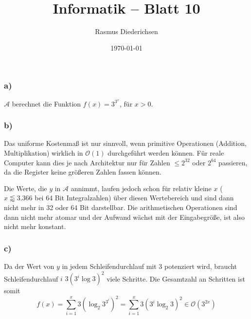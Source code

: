 \documentclass{article}
\title{Informatik \rotatebox[origin=c]{180}{D}\raisebox{2pt}{:} -- Blatt 10}
\author{Rasmus Diederichsen}
\date{\today}
\begin{document}
\maketitle

\section{} 
\subsection{} 
\subsubsection{a)}

$\mathcal{A}$ berechnet die Funktion $f(x) = 3^{3^x}$, für $x > 0$.

\subsubsection{b)}

Das uniforme Kostenmaß ist nur sinnvoll, wenn primitive Operationen
(Addition, Multiplikation) wirklich in $\mathcal{O}(1)$ durchgeführt werden
können. Für reale Computer kann dies je nach Architektur nur für Zahlen $\le
2^{32}$ oder $2^{64}$ passieren, da die Register keine größeren Zahlen fassen
können.

Die Werte, die $y$ in $\mathcal{A}$ annimmt, laufen jedoch schon für relativ
kleine $x$ ($x \lessapprox 3.366$ bei 64 Bit Integralzahlen) über diesen Wertebereich und
sind dann nicht mehr in 32 oder 64 Bit darstellbar. Die arithmetischen
Operationen sind dann nicht mehr atomar und der Aufwand wächst mit der
Eingabegröße, ist also nicht mehr konstant.

\subsubsection{c)}

Da der Wert von $y$ in jedem Schleifendurchlauf mit 3 potenziert wird, braucht
Schleifendurchlauf $i$ $3(3^i\log{3})^2$ viele Schritte. Die Gesamtzahl an
Schritten ist somit
\begin{equation*}
   f(x) = \sum\limits_{i=1}^x 3(\log_2 3^{3^i})^2 = \sum\limits_{i=1}^x 3(3^i\log_2 3)^2\in
   \mathcal{O}\left(3^{2x}\right)
\end{equation*}

\subsection{} 
\end{document}
